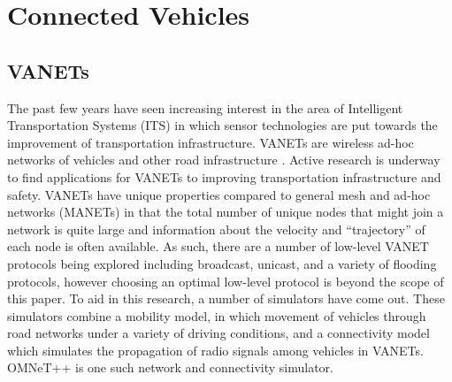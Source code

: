 \documentclass{thesis}
\begin{document}
    \section{Connected Vehicles}
    \subsection{VANETs}
        The past few years have seen increasing interest in the area of Intelligent Transportation
        Systems (ITS) in which sensor technologies are put towards the improvement of
        transportation infrastructure. VANETs are wireless ad-hoc networks of vehicles and other
        road infrastructure \cite{vanet:simulators}. Active research is underway to find applications 
        for VANETs to improving transportation infrastructure and safety. 
        VANETs have unique properties compared to general mesh and ad-hoc networks (MANETs) in that
        the total number of unique nodes that might join a network is quite large and information
        about the velocity and ``trajectory'' of each node is often available.
        As such, there are a number of low-level VANET protocols being explored including broadcast,
        unicast, and a variety of flooding protocols, however choosing an optimal low-level protocol is 
        beyond the scope of this paper.
        To aid in this research, a number of simulators have
        come out. These simulators combine a mobility model, in which movement of vehicles through road
        networks under a variety of driving conditions, and a connectivity model which simulates the
        propagation of radio signals among vehicles in VANETs. OMNeT++ is one such network and connectivity
        simulator.
\end{document}
